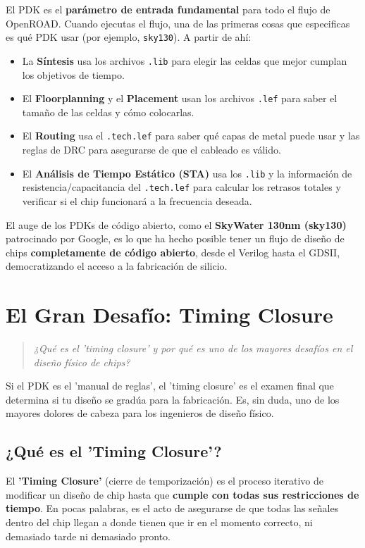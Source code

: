 \documentclass[12pt,a4paper]{article}
\newenvironment{pregunta}
  {\begin{leftbar}\begin{quote}\itshape}
  {\end{quote}\end{leftbar}}
\begin{document}
El PDK es el \textbf{parámetro de entrada fundamental} para todo el flujo de OpenROAD. Cuando ejecutas el flujo, una de las primeras cosas que especificas es qué PDK usar (por ejemplo, \texttt{sky130}). A partir de ahí:
\begin{itemize}
    \item La \textbf{Síntesis} usa los archivos \texttt{.lib} para elegir las celdas que mejor cumplan los objetivos de tiempo.
    \item El \textbf{Floorplanning} y el \textbf{Placement} usan los archivos \texttt{.lef} para saber el tamaño de las celdas y cómo colocarlas.
    \item El \textbf{Routing} usa el \texttt{.tech.lef} para saber qué capas de metal puede usar y las reglas de DRC para asegurarse de que el cableado es válido.
    \item El \textbf{Análisis de Tiempo Estático (STA)} usa los \texttt{.lib} y la información de resistencia/capacitancia del \texttt{.tech.lef} para calcular los retrasos totales y verificar si el chip funcionará a la frecuencia deseada.
\end{itemize}

El auge de los PDKs de código abierto, como el \textbf{SkyWater 130nm (sky130)} patrocinado por Google, es lo que ha hecho posible tener un flujo de diseño de chips \textbf{completamente de código abierto}, desde el Verilog hasta el GDSII, democratizando el acceso a la fabricación de silicio.

\newpage
\section{El Gran Desafío: Timing Closure}

\begin{pregunta}
¿Qué es el 'timing closure' y por qué es uno de los mayores desafíos en el diseño físico de chips?
\end{pregunta}

Si el PDK es el 'manual de reglas', el 'timing closure' es el examen final que determina si tu diseño se gradúa para la fabricación. Es, sin duda, uno de los mayores dolores de cabeza para los ingenieros de diseño físico.

\subsection{¿Qué es el 'Timing Closure'?}

El \textbf{'Timing Closure'} (cierre de temporización) es el proceso iterativo de modificar un diseño de chip hasta que \textbf{cumple con todas sus restricciones de tiempo}. En pocas palabras, es el acto de asegurarse de que todas las señales dentro del chip llegan a donde tienen que ir en el momento correcto, ni demasiado tarde ni demasiado pronto.
\end{document}
